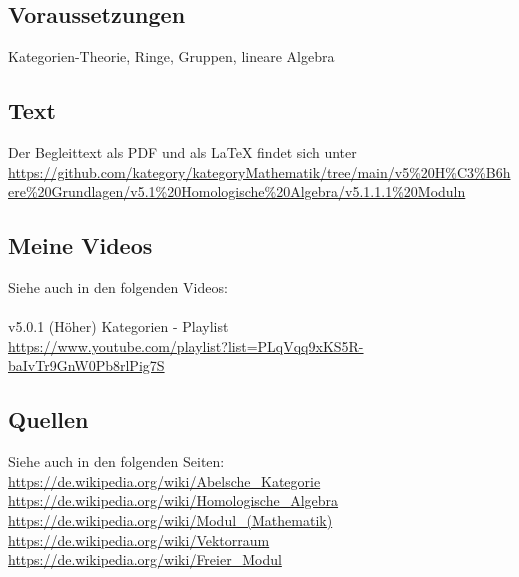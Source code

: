 \documentclass[a4paper]{amsart}
\theoremstyle{definition}
\begin{document}
\subsection*{Voraussetzungen}
Kategorien-Theorie, Ringe, Gruppen, lineare Algebra

\subsection*{Text}
Der Begleittext als PDF und als LaTeX findet sich unter
{\tiny
   \url{https://github.com/kategory/kategoryMathematik/tree/main/v5%20H%C3%B6here%20Grundlagen/v5.1%20Homologische%20Algebra/v5.1.1.1%20Moduln}
}

\subsection*{Meine Videos}
Siehe auch in den folgenden Videos:\\
\\
v5.0.1 (Höher) Kategorien - Playlist\\
\url{https://www.youtube.com/playlist?list=PLqVqq9xKS5R-baIvTr9GnW0Pb8rlPig7S}

\subsection*{Quellen}
Siehe auch in den folgenden Seiten:\\
\url{https://de.wikipedia.org/wiki/Abelsche_Kategorie}\\
\url{https://de.wikipedia.org/wiki/Homologische_Algebra}\\
\url{https://de.wikipedia.org/wiki/Modul_(Mathematik)}\\
\url{https://de.wikipedia.org/wiki/Vektorraum}\\
\url{https://de.wikipedia.org/wiki/Freier_Modul}
\end{document}
